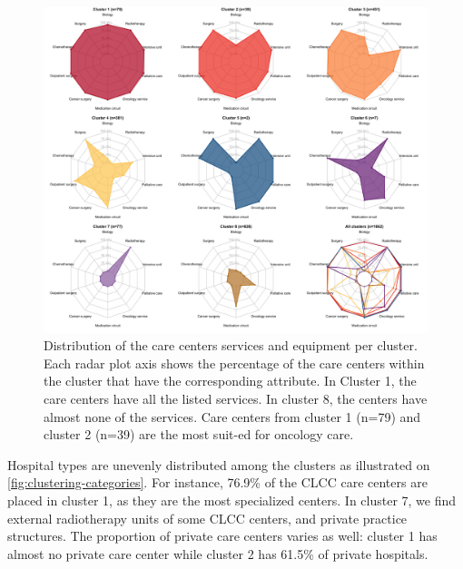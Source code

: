 \begin{figure}[t]
    \includegraphics[width=\textwidth]{images/camion/fig1_clusters_services.png}
    \centering
    \caption{
        Distribution of the care centers services and equipment per cluster. Each radar plot axis shows the percentage of the care centers within the cluster that have the corresponding attribute. In Cluster 1, the care centers have all the listed services. In cluster 8, the centers have almost none of the services. Care centers from cluster 1 (n=79) and cluster 2 (n=39) are the most suit-ed for oncology care.
    }
    \label{fig:clustering-spider}
\end{figure}

Hospital types are unevenly distributed among the clusters as illustrated on \cref{fig:clustering-categories}. For instance, 76.9\% of the CLCC care centers are placed in cluster 1, as they are the most specialized centers. In cluster 7, we find external radiotherapy units of some CLCC centers, and private practice structures. The proportion of private care centers varies as well: cluster 1 has almost no private care center while cluster 2 has 61.5\% of private hospitals.

